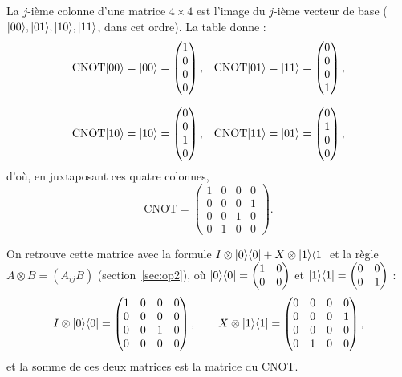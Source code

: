 La $j$-ième colonne d'une matrice $4\times4$ est l'image du $j$-ième vecteur de base
($|00\rangle,|01\rangle,|10\rangle,|11\rangle$, dans cet ordre). La table donne :
\begin{align*}
  \mathrm{CNOT}|00\rangle&=|00\rangle=\begin{pmatrix}1\\0\\0\\0\end{pmatrix},&
  \mathrm{CNOT}|01\rangle&=|11\rangle=\begin{pmatrix}0\\0\\0\\1\end{pmatrix},\\[1.5ex]
  \mathrm{CNOT}|10\rangle&=|10\rangle=\begin{pmatrix}0\\0\\1\\0\end{pmatrix},&
  \mathrm{CNOT}|11\rangle&=|01\rangle=\begin{pmatrix}0\\1\\0\\0\end{pmatrix},
\end{align*}
d'où, en juxtaposant ces quatre colonnes,
\[
  \mathrm{CNOT}=\begin{pmatrix}
    1 & 0 & 0 & 0\\ 0 & 0 & 0 & 1\\ 0 & 0 & 1 & 0\\ 0 & 1 & 0 & 0
  \end{pmatrix}.
\]

On retrouve cette matrice avec la formule $I\otimes|0\rangle\langle 0|+X\otimes|1\rangle\langle 1|$ et
la règle $A\otimes B=(A_{ij}B)$ (section~\ref{sec:op2}), où
$|0\rangle\langle 0|=\begin{pmatrix}1&0\\0&0\end{pmatrix}$ et
$|1\rangle\langle 1|=\begin{pmatrix}0&0\\0&1\end{pmatrix}$ :
\[
  I\otimes|0\rangle\langle 0|=\begin{pmatrix}1&0&0&0\\0&0&0&0\\0&0&1&0\\0&0&0&0\end{pmatrix},
  \qquad
  X\otimes|1\rangle\langle 1|=\begin{pmatrix}0&0&0&0\\0&0&0&1\\0&0&0&0\\0&1&0&0\end{pmatrix},
\]
et la somme de ces deux matrices est la matrice du CNOT.

